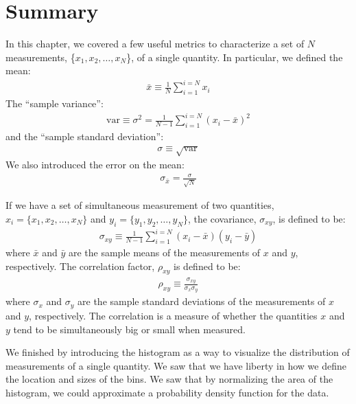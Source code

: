 \section{Summary}
In this chapter, we covered a few useful metrics to characterize a set of $N$ measurements, \{$x_1, x_2, \dots,x_N$\}, of a single quantity. In particular, we defined the mean:
\begin{align}
 \bar{x} \equiv \frac{1}{N} \sum_{i=1}^{i=N} x_i 
\end{align}
The ``sample variance'':
\begin{align}
 \text{var}\equiv \sigma^2 = \frac{1}{N-1} \sum_{i=1}^{i=N} (x_i-\bar{x})^2 
\end{align}
and the ``sample standard deviation'': 
\begin{align}
 \sigma\equiv\sqrt{\text{var}}
\end{align}
We also introduced the error on the mean:
\begin{align}
 \sigma_{\bar x}= \frac{\sigma}{\sqrt N}
\end{align}

If we have a set of simultaneous measurement of two quantities, $x_i=\{x_1, x_2,\dots, x_N\}$ and $y_i=\{y_1, y_2,\dots, y_N\}$, the covariance, $\sigma_{xy}$, is defined to be:
\begin{align}
\sigma_{xy}\equiv\frac{1}{N-1}\sum_{i=1}^{i=N}(x_i-\bar x)(y_i-\bar y)
\end{align}
where $\bar x$ and $\bar y$ are the sample means of the measurements of $x$ and $y$, respectively. The correlation factor, $\rho_{xy}$ is defined to be:
\begin{align}
\rho_{xy}\equiv\frac{\sigma_{xy}}{\sigma_x\sigma_y}
\end{align}
where $\sigma_x$ and $\sigma_y$ are the sample standard deviations of the measurements of $x$ and $y$, respectively. The correlation is a measure of whether the quantities $x$ and $y$ tend to be simultaneously big or small when measured.

We finished by introducing the histogram as a way to visualize the distribution of measurements of a single quantity. We saw that we have liberty in how we define the location and sizes of the bins. We saw that by normalizing the area of the histogram, we could approximate a probability density function for the data.